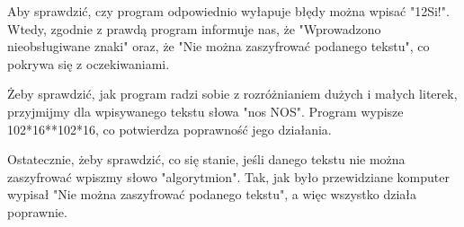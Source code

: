 \documentclass[12pt,a4paper]{article}
\begin{document}
        Aby sprawdzić, czy program odpowiednio wyłapuje błędy można wpisać "12Si!". Wtedy, zgodnie z prawdą program informuje nas, że "Wprowadzono nieobsługiwane znaki" oraz, że "Nie można zaszyfrować podanego tekstu", co pokrywa się z oczekiwaniami.

        Żeby sprawdzić, jak program radzi sobie z rozróżnianiem dużych i małych literek, przyjmijmy dla wpisywanego tekstu słowa "nos NOS". Program wypisze 102*16**102*16, co potwierdza poprawność jego działania.

        Ostatecznie, żeby sprawdzić, co się stanie, jeśli danego tekstu nie można zaszyfrować wpiszmy słowo "algorytmion". Tak, jak było przewidziane komputer wypisał "Nie można zaszyfrować podanego tekstu", a więc wszystko działa poprawnie.
\end{document}
